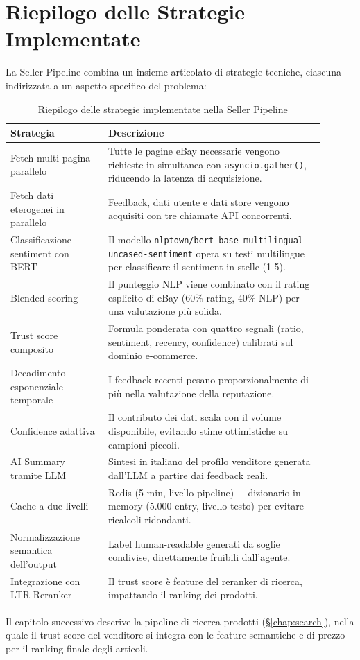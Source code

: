 \section{Riepilogo delle Strategie Implementate}
\label{sec:seller-summary}

La Seller Pipeline combina un insieme articolato di strategie tecniche,
ciascuna indirizzata a un aspetto specifico del problema:

\begin{table}[htbp]
\centering
\caption{Riepilogo delle strategie implementate nella Seller Pipeline}
\label{tab:seller-strategies}
\begin{tabular}{p{0.28\linewidth}p{0.62\linewidth}}
\hline
\textbf{Strategia} & \textbf{Descrizione} \\
\hline
Fetch multi-pagina parallelo & Tutte le pagine eBay necessarie vengono richieste in simultanea con \texttt{asyncio.gather()}, riducendo la latenza di acquisizione. \\
Fetch dati eterogenei in parallelo & Feedback, dati utente e dati store vengono acquisiti con tre chiamate API concorrenti. \\
Classificazione sentiment con BERT & Il modello \texttt{nlptown/bert-base-multilingual-uncased-sentiment} opera su testi multilingue per classificare il sentiment in stelle (1-5). \\
Blended scoring & Il punteggio NLP viene combinato con il rating esplicito di eBay (60\% rating, 40\% NLP) per una valutazione più solida. \\
Trust score composito & Formula ponderata con quattro segnali (ratio, sentiment, recency, confidence) calibrati sul dominio e-commerce. \\
Decadimento esponenziale temporale & I feedback recenti pesano proporzionalmente di più nella valutazione della reputazione. \\
Confidence adattiva & Il contributo dei dati scala con il volume disponibile, evitando stime ottimistiche su campioni piccoli. \\
AI Summary tramite LLM & Sintesi in italiano del profilo venditore generata dall'LLM a partire dai feedback reali. \\
Cache a due livelli & Redis (5 min, livello pipeline) + dizionario in-memory (5.000 entry, livello testo) per evitare ricalcoli ridondanti. \\
Normalizzazione semantica dell'output & Label human-readable generati da soglie condivise, direttamente fruibili dall'agente. \\
Integrazione con LTR Reranker & Il trust score è feature del reranker di ricerca, impattando il ranking dei prodotti. \\
\hline
\end{tabular}
\end{table}

Il capitolo successivo descrive la pipeline di ricerca prodotti
(\S\ref{chap:search}), nella quale il trust score del venditore
si integra con le feature semantiche e di prezzo per il ranking
finale degli articoli.
